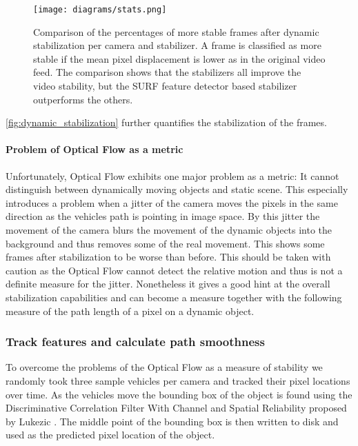 \begin{figure}[!ht]
      \texttt{[image: diagrams/stats.png]}    
    \caption{
        Comparison of the percentages of more stable frames after dynamic stabilization per camera and stabilizer.
        A frame is classified as more stable if the mean pixel displacement is lower as in the original video feed. 
        The comparison shows that the stabilizers all improve the video stability, but the SURF \cite{bay10.1007/11744023_32,opencv_library} feature detector based stabilizer outperforms the others.          
    }
    \label{fig:dynamic_stabilization}
\end{figure}

\autoref{fig:dynamic_stabilization} further quantifies the stabilization of the frames.

\paragraph{Problem of Optical Flow as a metric}
Unfortunately, Optical Flow exhibits one major problem as a metric: 
It cannot distinguish between dynamically moving objects and static scene.
This especially introduces a problem when a jitter of the camera moves the pixels in the same direction as the vehicles path is pointing in image space.
By this jitter the movement of the camera blurs the movement of the dynamic objects into the background and thus removes some of the real movement.
This shows some frames after stabilization to be worse than before. 
This should be taken with caution as the Optical Flow cannot detect the relative motion and thus is not a definite measure for the jitter.
Nonetheless it gives a good hint at the overall stabilization capabilities and can become a measure together with the following measure of the path length of a pixel on a dynamic object. 

\subsubsection{Track features and calculate path smoothness}
To overcome the problems of the Optical Flow as a measure of stability we randomly took three sample vehicles per camera and tracked their pixel locations over time.
As the vehicles move the bounding box of the object is found using the Discriminative Correlation Filter With Channel and Spatial Reliability proposed by Lukezic \etal{} \cite{Lukezic_2017_CVPR,opencv_library}.
The middle point of the bounding box is then written to disk and used as the predicted pixel location of the object.

